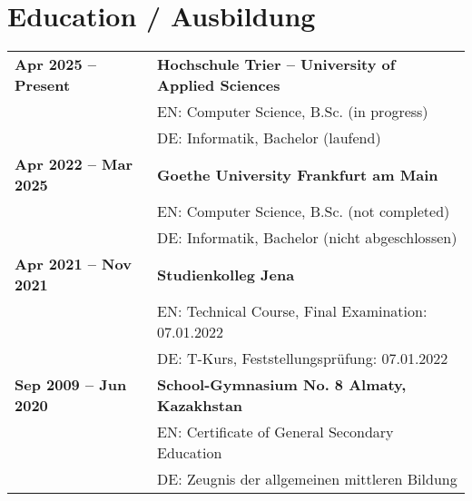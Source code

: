 \documentclass[11pt,a4paper]{article}
\begin{document}
\section*{Education / Ausbildung}
\begin{tabularx}{\textwidth}{@{}l X@{}}
\textbf{Apr 2025 -- Present} & \textbf{Hochschule Trier – University of Applied Sciences}\\
& EN: Computer Science, B.Sc. (in progress)\\
& DE: Informatik, Bachelor (laufend)\\[0.8em]

\textbf{Apr 2022 -- Mar 2025} & \textbf{Goethe University Frankfurt am Main}\\
& EN: Computer Science, B.Sc. (not completed)\\
& DE: Informatik, Bachelor (nicht abgeschlossen)\\[0.8em]

\textbf{Apr 2021 -- Nov 2021} & \textbf{Studienkolleg Jena}\\
& EN: Technical Course, Final Examination: 07.01.2022\\
& DE: T-Kurs, Feststellungsprüfung: 07.01.2022\\[0.8em]

\textbf{Sep 2009 -- Jun 2020} & \textbf{School-Gymnasium No. 8 Almaty, Kazakhstan}\\
& EN: Certificate of General Secondary Education\\
& DE: Zeugnis der allgemeinen mittleren Bildung
\end{tabularx}
\end{document}
